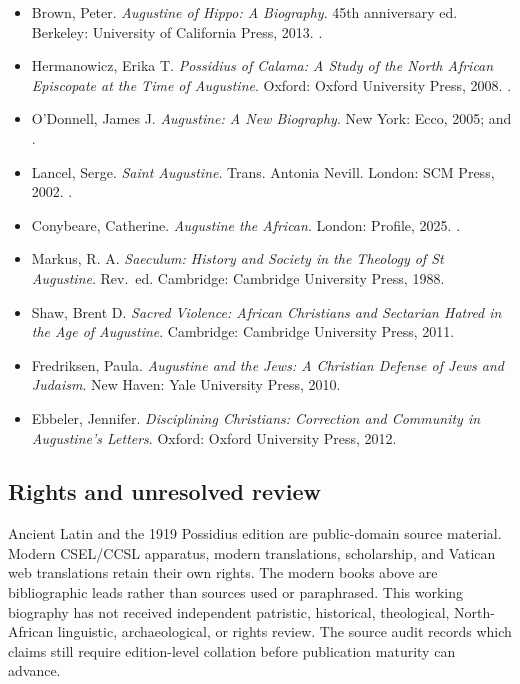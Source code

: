 \begin{itemize}
\item Brown, Peter. \emph{Augustine of Hippo: A Biography}. 45th anniversary
ed. Berkeley: University of California Press, 2013.
.
\item Hermanowicz, Erika T. \emph{Possidius of Calama: A Study of the North
African Episcopate at the Time of Augustine}. Oxford: Oxford University Press,
2008. .
\item O'Donnell, James J. \emph{Augustine: A New Biography}. New York:
Ecco, 2005; and
.
\item Lancel, Serge. \emph{Saint Augustine}. Trans. Antonia Nevill. London:
SCM Press, 2002.
.
\item Conybeare, Catherine. \emph{Augustine the African}. London: Profile,
2025. .
\item Markus, R. A. \emph{Saeculum: History and Society in the Theology of
St Augustine}. Rev.\ ed. Cambridge: Cambridge University Press, 1988.
\item Shaw, Brent D. \emph{Sacred Violence: African Christians and Sectarian
Hatred in the Age of Augustine}. Cambridge: Cambridge University Press, 2011.
\item Fredriksen, Paula. \emph{Augustine and the Jews: A Christian Defense of
Jews and Judaism}. New Haven: Yale University Press, 2010.
\item Ebbeler, Jennifer. \emph{Disciplining Christians: Correction and
Community in Augustine's Letters}. Oxford: Oxford University Press, 2012.
\end{itemize}

\subsection{Rights and unresolved review}

Ancient Latin and the 1919 Possidius edition are public-domain source material.
Modern CSEL/CCSL apparatus, modern translations, scholarship, and Vatican web
translations retain their own rights. The modern books above are bibliographic
leads rather than sources used or paraphrased. This working biography has not received
independent patristic, historical, theological, North-African linguistic,
archaeological, or rights review. The source audit records which claims still
require edition-level collation before publication maturity can advance.
